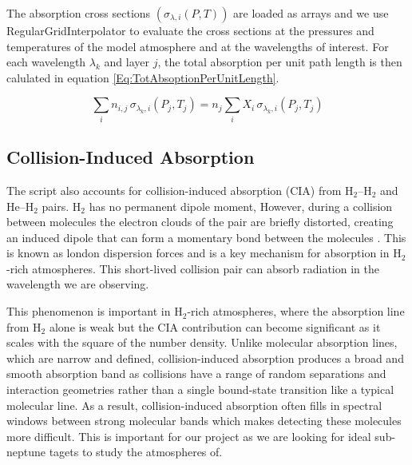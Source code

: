 \documentclass{article}
\begin{document}
The absorption cross sections $(\sigma_{\lambda,i}(P,T))$ are loaded as arrays and we use RegularGridInterpolator \cite{Scipy2020} to evaluate the cross sections at the pressures and temperatures of the model atmosphere and at the wavelengths of interest. 
For each wavelength $\lambda_k$ and layer $j$, the total absorption per unit path length is then calulated in equation \ref{Eq:TotAbsoptionPerUnitLength}.

\begin{equation}
	\sum_i n_{i,j} \, \sigma_{\lambda_k,i}(P_j,T_j) = n_j \sum_i X_i\,\sigma_{\lambda_k,i}(P_j,T_j)
	\label{Eq:TotAbsoptionPerUnitLength}
\end{equation}

\subsection{Collision-Induced Absorption}
\label{Section:CIA}
The script also accounts for collision-induced absorption (CIA) from H$_2$--H$_2$ and He--H$_2$ pairs.
H$_2$ has no permanent dipole moment, However, during a collision between molecules the electron clouds of the pair are briefly distorted, creating an induced dipole that can form a momentary bond between the molecules \cite{Richard2012}.
This is known as london dispersion forces and is a key mechanism for absorption in H$_2$-rich atmospheres.
This short-lived collision pair can absorb radiation in the wavelength we are observing.

This phenomenon is important in H$_2$-rich atmospheres, where the absorption line from H$_2$ alone is weak but the CIA contribution can become significant as it scales with the square of the number density.
Unlike molecular absorption lines, which are narrow and defined, collision-induced absorption produces a broad and smooth absorption band as collisions have a range of random separations and interaction geometries rather than a single bound-state transition like a typical molecular line.
As a result, collision-induced absorption often fills in spectral windows between strong molecular bands which makes detecting these molecules more difficult. This is important for our project as we are looking for ideal sub-neptune tagets to study the atmospheres of.
\end{document}
